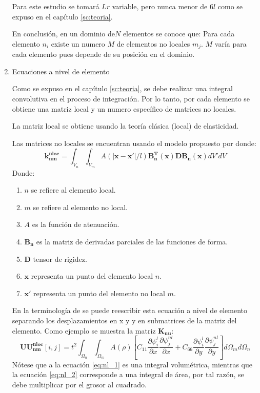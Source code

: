 \begin{enumerate}
				Para este estudio se tomará $Lr$ variable, pero nunca menor de $6l$ como se expuso en el capítulo \ref{sc:teoria}.

				En conclusión, en un dominio de$N$ elementos se conoce que: Para cada elemento $n_i$ existe un numero $M$ de elementos no locales $m_j$. $M$ varía para cada elemento pues depende de su posición en el dominio.
				\item Ecuaciones a nivel de elemento

				Como se expuso en el capítulo \ref{sc:teoria}, se debe realizar una integral convolutiva en el proceso de integración. Por lo tanto, por cada elemento se obtiene una matriz local y un numero específico de matrices no locales.

				La matriz local se obtiene usando la teoría clásica (local) de elasticidad.

				Las matrices no locales se encuentran usando el modelo propuesto por \textcite{Pisano2009} donde:
				\begin{equation}
					\boldsymbol{k_{nm}^{nloc}}=\int_{V_n}\int_{V_m}{A(|\boldsymbol{x}-\boldsymbol{x'}|/l)\boldsymbol{B_n^T}(\boldsymbol{x})\boldsymbol{D}\boldsymbol{B_n}(\boldsymbol{x})}{dV'}{dV}
					\label{eq:nl_1}
				\end{equation}
				Donde:
				\begin{enumerate}
					\item[] $n$ se refiere al elemento local.
					\item[] $m$ se refiere al elemento no local.
					\item[] $A$ es la función de atenuación.
					\item[] $\boldsymbol{B_n}$ es la matriz de derivadas parciales de las funciones de forma.
					\item[] $\boldsymbol{D}$ tensor de rigidez.
					\item[] $\boldsymbol{x}$ representa un punto del elemento local $n$.
					\item[] $\boldsymbol{x'}$ representa un punto del elemento no local $m$.
				\end{enumerate}
				En la terminología de \textcite{Reddy} se puede reescribir esta ecuación a nivel de elemento separando los desplazamientos en x y y en submatrices de la matriz del elemento. Como ejemplo se muestra la matriz $\boldsymbol{K_{uu}}$:
				\begin{equation}
					\boldsymbol{UU_{nm}^{nloc}}[i,j]=t^2\int_{\Omega_n}\int_{\Omega_m}{A(\rho)\left[C_{11}\frac{\partial \psi_i^{l}}{\partial x}\frac{\partial \psi_j^{nl}}{\partial x}+C_{66}\frac{\partial \psi_i^{l}}{\partial y}\frac{\partial \psi_j^{nl}}{\partial y}\right]}{d\Omega_m}{d\Omega_n}
				\label{eq:nl_2}
				\end{equation}
				Nótese que a la ecuación \ref{eq:nl_1} es una integral volumétrica, mientras que la ecuación \ref{eq:nl_2} corresponde a una integral de área, por tal razón, se debe multiplicar por el grosor al cuadrado.


\end{enumerate}
